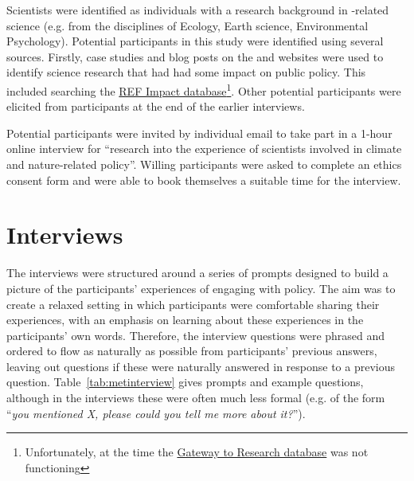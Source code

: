 Scientists were identified as individuals with a research background in \CAN-related science (e.g. from the disciplines of Ecology, Earth science, Environmental Psychology). Potential participants in this study were identified using several sources. Firstly, case studies and blog posts on the \REF{} and \UKRI{} websites were used to identify \CAN{} science research that had had some impact on public policy. This included searching the \href{https://results2021.ref.ac.uk/impact}{REF Impact database}\footnote{Unfortunately, at the time the \UKRI{} \href{https://gtr.gtr.ukri.org/}{Gateway to Research database} was not functioning}. Other potential participants were elicited from participants at the end of the earlier interviews.

Potential participants were invited by individual email to take part in a 1-hour online interview for ``research into the experience of scientists involved in climate and nature-related policy''. Willing participants were asked to complete an ethics consent form and were able to book themselves a suitable time for the interview.

\section{Interviews}\label{sec:metinterview}

The interviews were structured around a series of prompts designed to build a picture of the participants' experiences of engaging with policy. The aim was to create a relaxed setting in which participants were comfortable sharing their experiences, with an emphasis on learning about these experiences in the participants' own words. Therefore, the interview questions were phrased and ordered to flow as naturally as possible from participants' previous answers, leaving out questions if these were naturally answered in response to a previous question. Table~\ref{tab:metinterview} gives prompts and example questions, although in the interviews these were often much less formal (e.g. of the form ``\textit{you mentioned X, please could you tell me more about it?}'').

